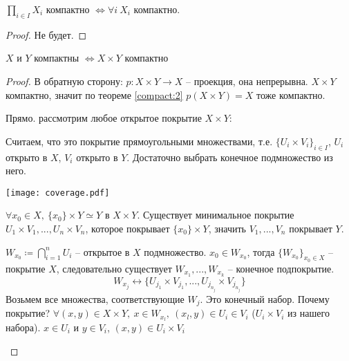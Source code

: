 \documentclass[main]{subfiles}
\begin{document}
\begin{theorem}[Тихонова]
    $\prod_{i \in I} X_i$ компактно $\Leftrightarrow \forall i\ X_i$ компактно.
\end{theorem}
\begin{proof}
    Не будет.
\end{proof}

\begin{theorem}\label{compact:3}
    $X$ и $Y$ компактны $\Leftrightarrow X \times Y$ компактно
\end{theorem}
\begin{proof}
    В обратную сторону: $p: X\times Y \to X$ -- проекция, она непрерывна.
    $X\times Y$ компактно, значит по теореме \ref{compact:2} $p(X \times Y) = X$ тоже компактно.

    Прямо. рассмотрим любое открытое покрытие $X \times Y$:
    \begin{enumerate}
        \begin{minipage}{0.45\textwidth}
            \item Считаем, что это покрытие прямоугольными множествами, т.е. $\{U_i \times V_i\}_{i \in I}$,
            $U_i$ открыто в $X$, $V_i$ открыто в $Y$.
            Достаточно выбрать конечное подмножество из него.
        \end{minipage}
        \begin{minipage}{0.45\textwidth}
            \texttt{[image: coverage.pdf]}
        \end{minipage}
        \item $\forall x_0 \in X,\ \{x_0\}\times Y \simeq Y$ в $X\times Y$.
              Существует минимальное покрытие $U_1 \times V_1, ..., U_n \times V_n$, которое покрывает $\{x_0\} \times Y$,
              значить $V_1, ..., V_n$ покрывает $Y$.

              $W_{x_0} \coloneqq \bigcap_{i=1}^n U_i$ -- открытое в $X$ подмножество.
              $x_0 \in W_{x_0}$, тогда $\{W_{x_0}\}_{x_0 \in X}$ -- покрытие $X$, следовательно существует $W_{x_1}, ..., W_{x_k}$ -- конечное подпокрытие.
              \[W_{x_j} \leftrightarrow \{U_{j_1} \times V_{j_1}, ..., U_{j_{n_j}} \times V_{j_{n_j}}\}\]
              Возьмем все множества, соответствующие $W_j$. Это конечный набор. Почему покрытие?
              $\forall (x,y) \in X \times Y,\ x\in W_{x_l},\ (x_l, y) \in U_i \in V_i$
              ($U_i \times V_i$ из нашего набора). $x \in U_i$ и $y \in V_i$, $(x,y) \in U_i \times V_i$
    \end{enumerate}
\end{proof}
\end{document}
